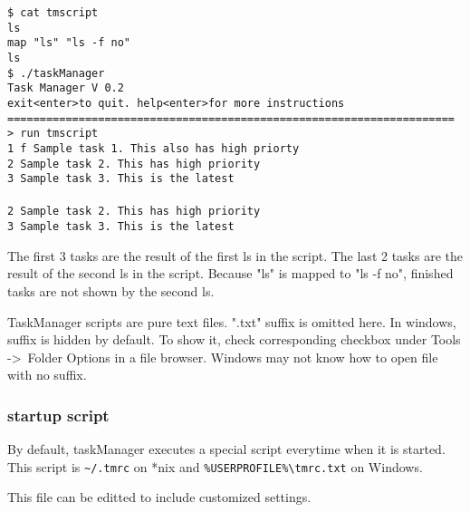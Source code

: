\documentclass[12pt, a4paper]{article}
\begin{document}
\noindent \texttt{\$ cat tmscript\\
  ls\\
  map "ls" "ls -f no"\\
  ls\\
  \$ ./taskManager\\
  Task Manager V 0.2\\
  exit\textless enter\textgreater to quit. help\textless enter\textgreater for more instructions\\
  =====================================================================\\
  \textgreater \ run tmscript\\
  1 f Sample task 1. This also has high priorty\\
  2   Sample task 2. This has high priority\\
  3   Sample task 3. This is the latest\\
  \\2   Sample task 2. This has high priority\\
  3   Sample task 3. This is the latest}

The first 3 tasks are the result of the first ls in the script. The last 2 tasks are the result of the second ls in the script. Because "ls" is mapped to "ls -f no", finished tasks are not shown by the second ls.

TaskManager scripts are pure text files. ".txt" suffix is omitted here. In windows, suffix is hidden by default. To show it, check corresponding checkbox under Tools -\textgreater \ Folder Options in a file browser.
Windows may not know how to open file with no suffix.

\subsubsection{startup script}

By default, taskManager executes a special script everytime when it is started. 
This script is \texttt{\~{}/.tmrc} on *nix and \texttt{\%USERPROFILE\%\textbackslash tmrc.txt} on Windows.

This file can be editted to include customized settings.
\end{document}
